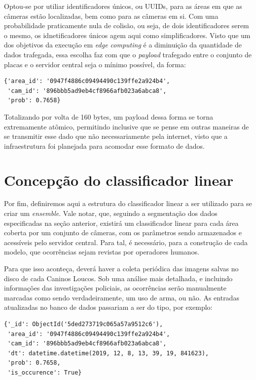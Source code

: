 \documentclass[]{politex}
\begin{document}
Optou-se por utiliar identificadores únicos, ou UUIDs, para as áreas em que as câmeras estão localizadas, bem como para as câmeras em si. Com uma probabilidade praticamente nula de colisão, ou seja, de dois identificadores serem o mesmo, os idnetificadores únicos agem aqui como simplificadores. Visto que um dos objetivos da execução em \textit{edge computing} é a diminuição da quantidade de dados trafegada, essa escolha faz com que o \textit{payload} trafegado entre o conjunto de placas e o servidor central seja o mínimo possível, da forma:

\begin{lstlisting}
{'area_id': '0947f4886c09494490c139ffe2a924b4',
 'cam_id': '896bbb5ad9eb4cf8966afb023a6abca8',
 'prob': 0.7658}
 \end{lstlisting}
 
 Totalizando por volta de 160 bytes, um payload dessa forma se torna extremamente atômico, permitindo inclusive que se pense em outras maneiras de se transmitir esse dado que não necessariamente pela internet, visto que a infraestrutura foi planejada para acomodar esse formato de dados.
 
\section{Concepção do classificador linear}

Por fim, definiremos aqui a estrutura do classificador linear a ser utilizado para se criar um \textit{ensemble}. Vale notar, que, seguindo a segmentação dos dados especificadas na seção anterior, existirá um classificador linear para cada área coberta por um conjunto de câmeras, com os parâmetros sendo armazenados e acessíveis pelo servidor central. Para tal, é necessário, para a construção de cada modelo, que ocorrências sejam revistas por operadores humanos.

Para que isso aconteça, deverá haver a coleta periódica das imagens salvas no disco de cada Caninos Loucos. Sob uma análise mais detalhada, e incluindo informações das investigações policiais, as ocorrências serão manualmente marcadas como sendo verdadeiramente, um uso de arma, ou não. As entradas atualizadas no banco de dados passariam a ser do tipo, por exemplo:

\begin{lstlisting}
{'_id': ObjectId('5ded273719c065a57a9512c6'),
 'area_id': '0947f4886c09494490c139ffe2a924b4',
 'cam_id': '896bbb5ad9eb4cf8966afb023a6abca8',
 'dt': datetime.datetime(2019, 12, 8, 13, 39, 19, 841623),
 'prob': 0.7658,
 'is_occurence': True}
\end{lstlisting}
\end{document}

